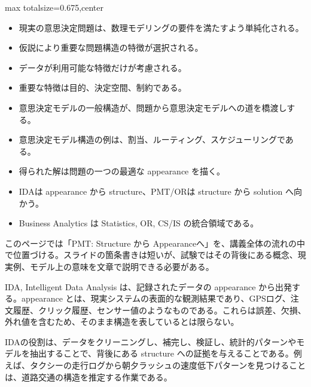 \clearpage
{}
\begin{adjustbox}{max totalsize={\textwidth}{0.675\textheight},center}
\begin{minipage}{\textwidth}\scriptsize
\begin{minipage}[t]{0.485\textwidth}
\begin{itemize}
\item 現実の意思決定問題は、数理モデリングの要件を満たすよう単純化される。
\item 仮説により重要な問題構造の特徴が選択される。
\item データが利用可能な特徴だけが考慮される。
\item 重要な特徴は目的、決定空間、制約である。
\item 意思決定モデルの一般構造が、問題から意思決定モデルへの道を橋渡しする。
\item 意思決定モデル構造の例は、割当、ルーティング、スケジューリングである。
\item 得られた解は問題の一つの最適な appearance を描く。
\end{itemize}
\begin{itemize}
\item IDAは appearance から structure、PMT/ORは structure から solution へ向かう。
\item Business Analytics は Statistics, OR, CS/IS の統合領域である。
\end{itemize}
\end{minipage}\hfill
\begin{minipage}[t]{0.485\textwidth}
このページでは「PMT: Structure から Appearanceへ」を、講義全体の流れの中で位置づける。スライドの箇条書きは短いが、試験ではその背後にある概念、現実例、モデル上の意味を文章で説明できる必要がある。\par
IDA, Intelligent Data Analysis は、記録されたデータの appearance から出発する。appearance とは、現実システムの表面的な観測結果であり、GPSログ、注文履歴、クリック履歴、センサー値のようなものである。これらは誤差、欠損、外れ値を含むため、そのまま構造を表しているとは限らない。\par
IDAの役割は、データをクリーニングし、補完し、検証し、統計的パターンやモデルを抽出することで、背後にある structure への証拠を与えることである。例えば、タクシーの走行ログから朝夕ラッシュの速度低下パターンを見つけることは、道路交通の構造を推定する作業である。\par

\end{minipage}
\end{minipage}
\end{adjustbox}
